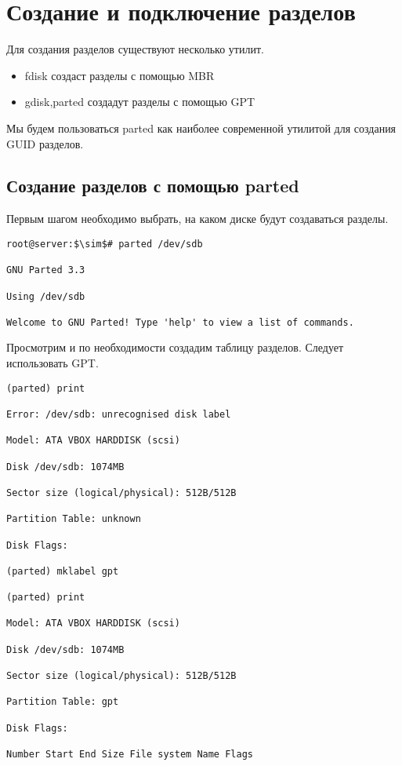 \documentclass[14pt, a4paper]{article}
\begin{document}
\newpage

\section*{Создание и подключение разделов} 

Для создания разделов существуют несколько утилит.
\begin{itemize}
    \item \colorbox{backcolour}{fdisk} создаст разделы с помощью MBR
    \item \colorbox{backcolour}{gdisk,parted} создадут разделы с помощью GPT
\end{itemize}

Мы будем пользоваться \colorbox{backcolour}{parted} как наиболее современной утилитой для создания GUID разделов.

\subsection*{Создание разделов с помощью parted} 

Первым шагом необходимо выбрать, на каком диске будут создаваться разделы.

\vspace{0.3cm}

\begin{lstlisting}[mathescape=true]
root@server:$\sim$# parted /dev/sdb

GNU Parted 3.3

Using /dev/sdb

Welcome to GNU Parted! Type 'help' to view a list of commands.

\end{lstlisting}

\vspace{0.2cm}
Просмотрим и по необходимости создадим таблицу разделов. Следует использовать GPT.
\vspace{0.3cm}

\begin{lstlisting}
(parted) print

Error: /dev/sdb: unrecognised disk label

Model: ATA VBOX HARDDISK (scsi)

Disk /dev/sdb: 1074MB

Sector size (logical/physical): 512B/512B

Partition Table: unknown

Disk Flags:

(parted) mklabel gpt

(parted) print

Model: ATA VBOX HARDDISK (scsi)

Disk /dev/sdb: 1074MB

Sector size (logical/physical): 512B/512B

Partition Table: gpt

Disk Flags:

Number Start End Size File system Name Flags

\end{lstlisting}
\end{document}
